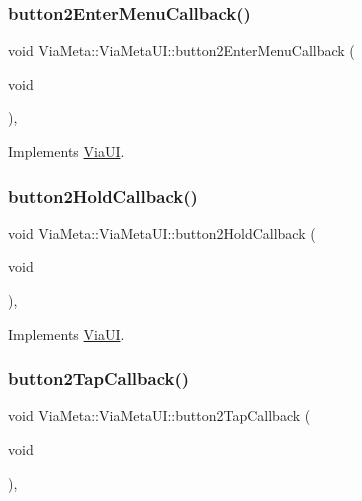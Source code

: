 \subsubsection{\texorpdfstring{button2\+Enter\+Menu\+Callback()}{button2EnterMenuCallback()}}
{\footnotesize\ttfamily void Via\+Meta\+::\+Via\+Meta\+U\+I\+::button2\+Enter\+Menu\+Callback (\begin{DoxyParamCaption}\item[{void}]{ }\end{DoxyParamCaption})\hspace{0.3cm}{\ttfamily [override]}, {\ttfamily [virtual]}}



Implements \mbox{\hyperlink{class_via_u_i_ac7b7f919edba9a640e7009e1f9303a2d}{Via\+UI}}.

\mbox{\label{class_via_meta_1_1_via_meta_u_i_acf5ef9a82372db43ab80437747167d9f}} 
\subsubsection{\texorpdfstring{button2\+Hold\+Callback()}{button2HoldCallback()}}
{\footnotesize\ttfamily void Via\+Meta\+::\+Via\+Meta\+U\+I\+::button2\+Hold\+Callback (\begin{DoxyParamCaption}\item[{void}]{ }\end{DoxyParamCaption})\hspace{0.3cm}{\ttfamily [override]}, {\ttfamily [virtual]}}



Implements \mbox{\hyperlink{class_via_u_i_a95bce2d662a8ae46be73497e868aebb9}{Via\+UI}}.

\mbox{\label{class_via_meta_1_1_via_meta_u_i_a3d9aa9b0cc62a32b79541e25bbec6bd5}} 
\subsubsection{\texorpdfstring{button2\+Tap\+Callback()}{button2TapCallback()}}
{\footnotesize\ttfamily void Via\+Meta\+::\+Via\+Meta\+U\+I\+::button2\+Tap\+Callback (\begin{DoxyParamCaption}\item[{void}]{ }\end{DoxyParamCaption})\hspace{0.3cm}{\ttfamily [override]}, {\ttfamily [virtual]}}



